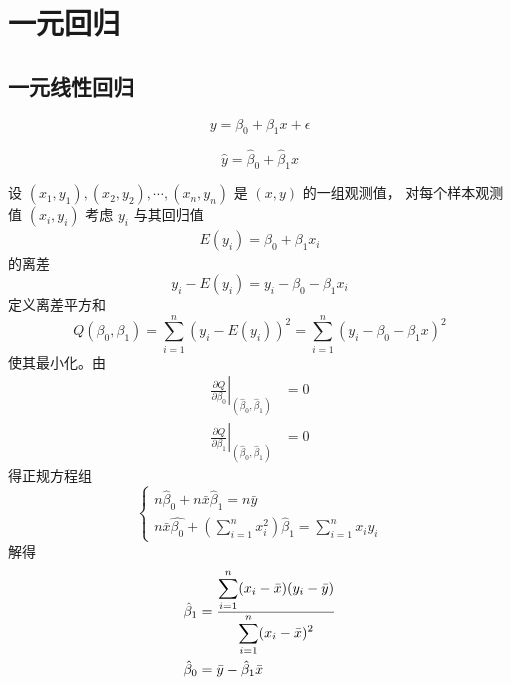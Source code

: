 \section{一元回归}

\subsection{一元线性回归}

 \begin{equation}
    y = \beta_0 + \beta_1 x + \epsilon
\end{equation}

 \begin{equation}
    \hat{y} = \hat{\beta}_0 + \hat{\beta}_1 x
\end{equation}

 设 $ (x_1, y_1), (x_2, y_2), \cdots, (x_n, y_n) $ 是 $ (x,y) $ 的一组观测值，
对每个样本观测值 $ (x_i, y_i) $ 考虑 $ y_i $ 与其回归值
\begin{eqnarray}
    E(y_i) = \beta_0 + \beta_1 x_i
\end{eqnarray}
的离差
\begin{equation}
    y_i - E(y_i) = y_i - \beta_0 - \beta_1 x_i
\end{equation}
定义离差平方和
\begin{equation}
    Q(\beta_0, \beta_1) = \sum_{i=1}^{n} (y_i - E(y_i))^2 = \sum_{i=1}^{n}(y_i - \beta_0 - \beta_1 x)^2
\end{equation}
使其最小化。由
\begin{align*}
    \left. \frac{\partial Q}{\partial\beta_0} \right|_{(\hat{\beta}_0, \hat{\beta}_1)} & = 0 \\
    \left. \frac{\partial Q}{\partial\beta_1} \right|_{(\hat{\beta}_0, \hat{\beta}_1)} & = 0
\end{align*}
得正规方程组
\begin{equation}
    \left\{\begin{array}{l}
        n\hat{\beta}_0 + n\bar{x} \hat{\beta}_1 = n\bar{y} \\
        n\bar{x}\hat{\beta_0} + \left( \displaystyle{\sum_{i=1}^{n}x_i^2} \right) \hat{\beta}_1 = \sum_{i=1}^{n}x_iy_i
    \end{array}\right.
\end{equation}
解得
\begin{align}
    \hat{\beta}_1 & = \displaystyle{\frac{\displaystyle{\sum_{i=1}^{n}(x_i - \bar{x})(y_i - \bar{y})}}{\displaystyle{\sum_{i=1}^{n}(x_i - \bar{x})^2}}} \\
    \hat{\beta}_0 & = \bar{y} - \hat{\beta}_1 \bar{x}
\end{align}

